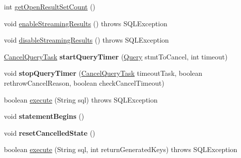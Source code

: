\begin{DoxyCompactItemize}
\item 
int \mbox{\hyperlink{classcom_1_1mysql_1_1cj_1_1jdbc_1_1_statement_impl_ac4a8718b3d1e416f72dbe33370434b0d}{get\+Open\+Result\+Set\+Count}} ()
\item 
void \mbox{\hyperlink{classcom_1_1mysql_1_1cj_1_1jdbc_1_1_statement_impl_a973ff5045e258a5c3e156887c116c976}{enable\+Streaming\+Results}} ()  throws S\+Q\+L\+Exception 
\item 
void \mbox{\hyperlink{classcom_1_1mysql_1_1cj_1_1jdbc_1_1_statement_impl_a9e5713d601e7e410e0edb1647b6f9160}{disable\+Streaming\+Results}} ()  throws S\+Q\+L\+Exception 
\item 
\mbox{\label{classcom_1_1mysql_1_1cj_1_1jdbc_1_1_statement_impl_a0f8e090e92e82672734e247c080f7da7}} 
\mbox{\hyperlink{interfacecom_1_1mysql_1_1cj_1_1_cancel_query_task}{Cancel\+Query\+Task}} {\bfseries start\+Query\+Timer} (\mbox{\hyperlink{interfacecom_1_1mysql_1_1cj_1_1_query}{Query}} stmt\+To\+Cancel, int timeout)
\item 
\mbox{\label{classcom_1_1mysql_1_1cj_1_1jdbc_1_1_statement_impl_a45e2d251ef9edf83345cde29d58dd704}} 
void {\bfseries stop\+Query\+Timer} (\mbox{\hyperlink{interfacecom_1_1mysql_1_1cj_1_1_cancel_query_task}{Cancel\+Query\+Task}} timeout\+Task, boolean rethrow\+Cancel\+Reason, boolean check\+Cancel\+Timeout)
\item 
boolean \mbox{\hyperlink{classcom_1_1mysql_1_1cj_1_1jdbc_1_1_statement_impl_a55932ba2147827cc8b76353c14332c1f}{execute}} (String sql)  throws S\+Q\+L\+Exception 
\item 
\mbox{\label{classcom_1_1mysql_1_1cj_1_1jdbc_1_1_statement_impl_a51c8920bf35fc909ec12c2755ee2c491}} 
void {\bfseries statement\+Begins} ()
\item 
\mbox{\label{classcom_1_1mysql_1_1cj_1_1jdbc_1_1_statement_impl_afca7737baacefddb5151fa0c81a20ee0}} 
void {\bfseries reset\+Cancelled\+State} ()
\item 
boolean \mbox{\hyperlink{classcom_1_1mysql_1_1cj_1_1jdbc_1_1_statement_impl_a3a037fac1a8f37129b0eab24203b73f9}{execute}} (String sql, int return\+Generated\+Keys)  throws S\+Q\+L\+Exception 
\item 

\end{DoxyCompactItemize}
